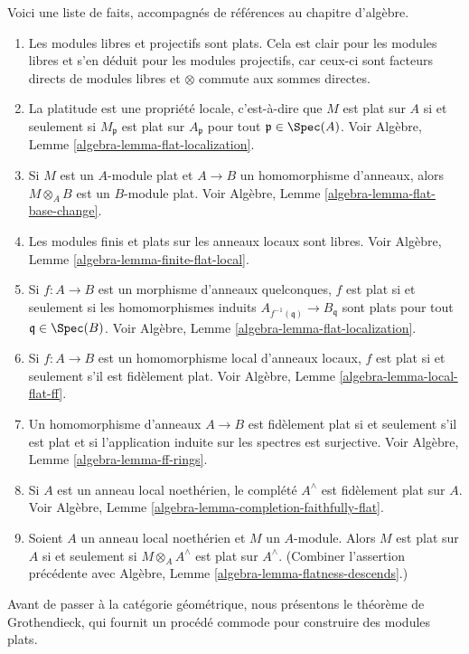 \noindent
Voici une liste de faits, accompagnés de références au chapitre d'algèbre.
\begin{enumerate}
\item Les modules libres et projectifs sont plats. Cela est clair pour les modules libres
et s'en déduit pour les modules projectifs, car ceux-ci sont facteurs directs de modules
libres et $\otimes$ commute aux sommes directes.
\item La platitude est une propriété locale, c'est-à-dire que $M$ est plat sur $A$
si et seulement si $M_{\mathfrak p}$ est plat sur $A_{\mathfrak p}$ pour tout
$\mathfrak p \in \Spec(A)$.
Voir Algèbre, Lemme \ref{algebra-lemma-flat-localization}.
\item Si $M$ est un $A$-module plat et $A \to B$ un homomorphisme d'anneaux,
alors $M \otimes_A B$ est un $B$-module plat. Voir
Algèbre, Lemme \ref{algebra-lemma-flat-base-change}.
\item Les modules finis et plats sur les anneaux locaux sont libres.
Voir Algèbre, Lemme \ref{algebra-lemma-finite-flat-local}.
\item Si $f : A \to B$ est un morphisme d'anneaux quelconques,
$f$ est plat si et seulement si les homomorphismes induits
$A_{f^{-1}(\mathfrak q)} \to B_{\mathfrak q}$ sont plats pour tout
$\mathfrak q \in \Spec(B)$.
Voir Algèbre, Lemme \ref{algebra-lemma-flat-localization}.
\item Si $f : A \to B$ est un homomorphisme local d'anneaux locaux,
$f$ est plat si et seulement s'il est fidèlement plat.
Voir Algèbre, Lemme \ref{algebra-lemma-local-flat-ff}.
\item Un homomorphisme d'anneaux $A \to B$ est fidèlement plat si et seulement s'il est
plat et si l'application induite sur les spectres est surjective.
Voir Algèbre, Lemme \ref{algebra-lemma-ff-rings}.
\item Si $A$ est un anneau local noethérien, le complété
$A^\wedge$ est fidèlement plat sur $A$.
Voir Algèbre, Lemme \ref{algebra-lemma-completion-faithfully-flat}.
\item Soient $A$ un anneau local noethérien et $M$ un $A$-module.
Alors $M$ est plat sur $A$ si et seulement si $M \otimes_A A^\wedge$
est plat sur $A^\wedge$. (Combiner l'assertion précédente avec
Algèbre, Lemme \ref{algebra-lemma-flatness-descends}.)
\end{enumerate}
Avant de passer à la catégorie géométrique, nous présentons le théorème de
Grothendieck, qui fournit un procédé commode pour construire des modules
plats.

